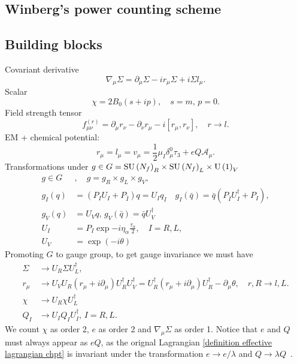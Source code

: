 \subsection{Winberg's power counting scheme}



\subsection{Building blocks}

Covariant derivative
%
\begin{equation}
    \nabla_\mu\Sigma = \partial_\mu \Sigma - ir_\mu \Sigma + i \Sigma l_\mu.
\end{equation}
%
Scalar
%
\begin{equation}
    \chi = 2 B_0 (s + ip), \quad s = m, \, p = 0.
\end{equation}
%
Field strength tensor
%
\begin{equation}
    f_{\mu \nu}^{(r)} = \partial_\mu r_\nu - \partial_\nu r_\mu - i[r_\mu, r_\nu], 
    \quad r\rightarrow l.
\end{equation}
%
EM + chemical potential:
%
\begin{equation}
    r_\mu = l_\mu = v_\mu 
    = 
    \frac{1}{2} \mu_I \delta^0_\mu \tau_3
    + e Q \mathcal{A}_\mu.
\end{equation}
%
Transformations under $g \in G = \text{SU}\left(N_f\right)_R \times \text{SU}\left(N_f\right)_L \times \text{U}\left(1\right)_V$
\begin{align}
    g\in G&, \quad  g = g_R \times g_L \times g_V, \\
    g_I(q) &= (P_I U_I + P_{\bar{I}}) q = U_I q_I \quad
    g_I(\bar q) = \bar q (P_{\bar{I}} U_I^\dagger + P_I), \\
    g_V(q) & = U_V q, \, g_V(\bar q) = \bar q U_V^\dagger \\
    U_I &= P_I \exp{-i \eta_\alpha \frac{\tau_\alpha}{2} }, \quad I = R, L, \\
    U_V &= \exp(- i \theta)
\end{align}
Promoting $G$ to gauge group, to get gauge invariance we must have
%
\begin{align}
    \Sigma &\rightarrow U_R \Sigma U_L^\dagger, \\
    r_\mu &\rightarrow U_V U_R (r_\mu + i\partial_\mu) U_R^\dagger U_V^\dagger
    = U_R^\dagger (r_\mu + i \partial_\mu) U_R^\dagger - \partial_\mu \theta, \quad 
    r, R \rightarrow l, L. \\
    \chi &\rightarrow U_R \chi U_L^\dagger \\
    Q_I &\rightarrow U_I Q_I U_I^\dagger, \, I = R, L.
\end{align}
%
We count $\chi$ as order 2, $e$ as order 2 and $\nabla_\mu\Sigma$ as order 1.
Notice that $e$ and $Q$ must always appear as $e Q$, as the orignal Lagrangian \autoref{definition effective lagrangian chpt} is invariant under the transformation $e \rightarrow e/\lambda$ and $Q \rightarrow \lambda Q$~\autocite{pencoIntroductionEffectiveField2020}.